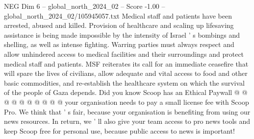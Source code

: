 \begin{textsample}{NEG Dim 6 – global\_north\_2024\_02 – Score -1.00 – global\_north\_2024\_02/105945057.txt}
Medical staff and patients have been arrested, abused and killed.
Provision of healthcare and scaling up lifesaving assistance is being made impossible by the intensity of Israel ' s bombings and shelling, as well as intense fighting.
Warring parties must always respect and allow unhindered access to medical facilities and their surroundings and protect medical staff and patients.
MSF reiterates its call for an immediate ceasefire that will spare the lives of civilians, allow adequate and vital access to food and other basic commodities, and re-establish the healthcare system on which the survival of the people of Gaza depends.
Did you know Scoop has an Ethical Paywall @ @ @ @ @ @ @ @ @ @ your organisation needs to pay a small license fee with Scoop Pro.
We think that ' s fair, because your organisation is benefiting from using our news resources.
In return, we ' ll also give your team access to pro news tools and keep Scoop free for personal use, because public access to news is important!

\end{textsample}
